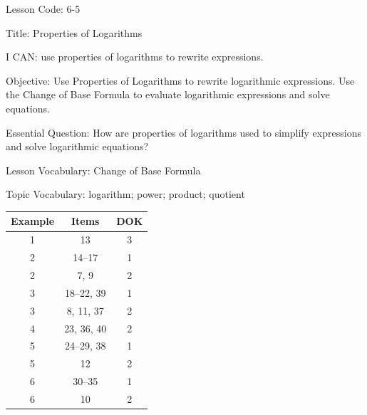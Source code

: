 \documentclass{article}
\newenvironment{lesson-meta}{}{}        %
\newenvironment{item-analysis}{}{}      %
\begin{document}
\begin{lesson-meta}
Lesson Code: 6-5

Title: Properties of Logarithms

I CAN: use properties of logarithms to rewrite expressions.

Objective: Use Properties of Logarithms to rewrite logarithmic expressions. Use the Change of Base Formula to evaluate logarithmic expressions and solve equations.

Essential Question: How are properties of logarithms used to simplify expressions and solve logarithmic equations?

Lesson Vocabulary: Change of Base Formula

Topic Vocabulary: logarithm; power; product; quotient
\end{lesson-meta}

\begin{item-analysis}
\begin{tabular}{ccc}
\toprule
Example & Items & DOK \\
\midrule
1 & 13 & 3 \\
2 & 14--17 & 1 \\
2 & 7, 9 & 2 \\
3 & 18--22, 39 & 1 \\
3 & 8, 11, 37 & 2 \\
4 & 23, 36, 40 & 2 \\
5 & 24--29, 38 & 1 \\
5 & 12 & 2 \\
6 & 30--35 & 1 \\
6 & 10 & 2 \\
\bottomrule
\end{tabular}
\end{item-analysis}
\end{document}
